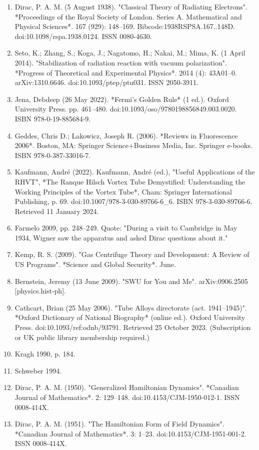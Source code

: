 \begin{enumerate}
\item Dirac, P. A. M. (5 August 1938). "Classical Theory of Radiating Electrons". *Proceedings of the Royal Society of London. Series A. Mathematical and Physical Sciences*. 167 (929): 148–169. Bibcode:1938RSPSA.167..148D. doi:10.1098/rspa.1938.0124. ISSN 0080-4630.
\item Seto, K.; Zhang, S.; Koga, J.; Nagatomo, H.; Nakai, M.; Mima, K. (1 April 2014). "Stabilization of radiation reaction with vacuum polarization". *Progress of Theoretical and Experimental Physics*. 2014 (4): 43A01–0. arXiv:1310.6646. doi:10.1093/ptep/ptu031. ISSN 2050-3911.
\item Jena, Debdeep (26 May 2022). *Fermi's Golden Rule* (1 ed.). Oxford University Press. pp. 461–480. doi:10.1093/oso/9780198856849.003.0020. ISBN 978-0-19-885684-9.
\item Geddes, Chris D.; Lakowicz, Joseph R. (2006). *Reviews in Fluorescence 2006*. Boston, MA: Springer Science+Business Media, Inc. Springer e-books. ISBN 978-0-387-33016-7.
\item Kaufmann, André (2022). Kaufmann, André (ed.), "Useful Applications of the RHVT", *The Ranque Hilsch Vortex Tube Demystified: Understanding the Working Principles of the Vortex Tube*, Cham: Springer International Publishing, p. 69. doi:10.1007/978-3-030-89766-6_6. ISBN 978-3-030-89766-6. Retrieved 11 January 2024.
\item Farmelo 2009, pp. 248–249. Quote: "During a visit to Cambridge in May 1934, Wigner saw the apparatus and asked Dirac questions about it."
\item Kemp, R. S. (2009). "Gas Centrifuge Theory and Development: A Review of US Programs". *Science and Global Security*. June.
\item Bernstein, Jeremy (13 June 2009). "SWU for You and Me". arXiv:0906.2505 [physics.hist-ph].
\item Cathcart, Brian (25 May 2006). "Tube Alloys directorate (act. 1941–1945)". *Oxford Dictionary of National Biography* (online ed.). Oxford University Press. doi:10.1093/ref:odnb/93791. Retrieved 25 October 2023. (Subscription or UK public library membership required.)
\item Kragh 1990, p. 184.
\item Schweber 1994.
\item Dirac, P. A. M. (1950). "Generalized Hamiltonian Dynamics". *Canadian Journal of Mathematics*. 2: 129–148. doi:10.4153/CJM-1950-012-1. ISSN 0008-414X.
\item Dirac, P. A. M. (1951). "The Hamiltonian Form of Field Dynamics". *Canadian Journal of Mathematics*. 3: 1–23. doi:10.4153/CJM-1951-001-2. ISSN 0008-414X.

\end{enumerate}
